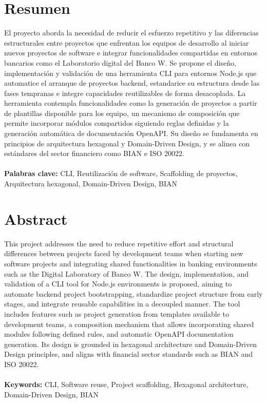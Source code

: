 
\section*{Resumen}

El proyecto aborda la necesidad de reducir el esfuerzo repetitivo y las diferencias estructurales entre proyectos que enfrentan los equipos de desarrollo al iniciar nuevos proyectos de software e integrar funcionalidades compartidas en entornos bancarios como el Laboratorio digital del Banco W. Se propone el diseño, implementación y validación de una herramienta CLI para entornos Node.js que automatice el arranque de proyectos backend, estandarice su estructura desde las fases tempranas e integre capacidades reutilizables de forma desacoplada. La herramienta contempla funcionalidades como la generación de proyectos a partir de plantillas disponible para los equipo, un mecanismo de composición que permite incorporar módulos compartidos siguiendo reglas definidas y la generación automática de documentación OpenAPI. Su diseño se fundamenta en principios de arquitectura hexagonal y Domain-Driven Design, y se alinea con estándares del sector financiero como BIAN e ISO 20022. 
\\\\
\textbf{Palabras clave:} CLI, Reutilización de software, Scaffolding de proyectos, Arquitectura hexagonal, Domain-Driven Design, BIAN

\pagebreak

\section*{Abstract}

This project addresses the need to reduce repetitive effort and structural differences between projects faced by development teams when starting new software projects and integrating shared functionalities in banking environments such as the Digital Laboratory of Banco W. The design, implementation, and validation of a CLI tool for Node.js environments is proposed, aiming to automate backend project bootstrapping, standardize project structure from early stages, and integrate reusable capabilities in a decoupled manner. The tool includes features such as project generation from templates available to development teams, a composition mechanism that allows incorporating shared modules following defined rules, and automatic OpenAPI documentation generation. Its design is grounded in hexagonal architecture and Domain-Driven Design principles, and aligns with financial sector standards such as BIAN and ISO 20022.
\\\\
\textbf{Keywords:} CLI, Software reuse, Project scaffolding, Hexagonal architecture, Domain-Driven Design, BIAN